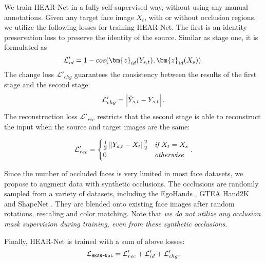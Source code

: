 We train HEAR-Net in a fully self-supervised way, without using any manual annotations. 
Given any target face image $X_t$, with or without occlusion regions, we utilize the following losses for training HEAR-Net. The first is an identity preservation loss to preserve the identity of the source. Similar as stage one, it is formulated as 
\vspace{-0.5em}
\begin{equation}
\vspace{-0.5em}
\label{eqn:L_id2}
\mathcal{L}'_{id} =  1 - cos(\bm{z}_{id}(Y_{s, t}), \bm{z}_{id}(X_s) ).
\end{equation}
The change loss $\mathcal{L}'_{chg}$ guarantees the consistency between the results of the first stage and the second stage:
\vspace{-0.5em}
\begin{equation}
\vspace{-0.5em}
\label{eqn:L_change}
\mathcal{L}'_{chg} =  \left|\hat{Y}_{s,t} - Y_{s,t}\right|.
\end{equation}
The reconstruction loss $\mathcal{L}'_{rec}$ restricts that the second stage is able to reconstruct the input when the source and target images are the same:

\vspace{-0.5em} 
\begin{equation}
\vspace{-0.5em}
\label{eqn:L_rec}
\mathcal{L}'_{rec} = 
\begin{cases}
 \frac{1}{2} \left\|Y_{s,t} - X_t\right\|_2^2 & \textit{if}~ X_t = X_s \\
0 & \textit{otherwise}
\end{cases}.
\end{equation} 

Since the number of occluded faces is very limited in most face datasets, we propose to augment data with synthetic occlusions.
The occlusions are randomly sampled from a variety of datasets, including the EgoHands \cite{bambach2015lending}, GTEA Hand2K \cite{fathi2011learning,li2015delving,li2013learning} and ShapeNet \cite{chang2015shapenet}.
They are blended onto existing face images after random rotations, rescaling and color matching. Note that \emph{we do not utilize any occlusion mask supervision during training, even from these synthetic occlusions}.

Finally, HEAR-Net is trained with a sum of above losses: 
\vspace{-0.5em}
\begin{equation}
\vspace{-0.5em}
\label{eqn:L_stage2}
\mathcal{L}_\texttt{HEAR-Net} = \mathcal{L}'_{rec} +\mathcal{L}'_{id} + \mathcal{L}'_{chg}.
\end{equation}

